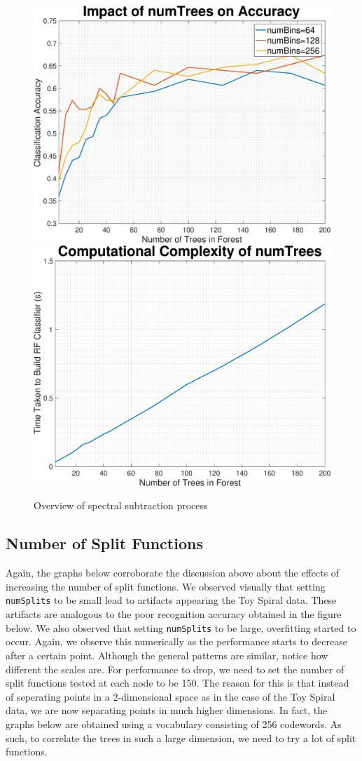 \documentclass[a4paper,pra,twocolumn,10pt,aps,longbibliography,nobalancelastpage]{revtex4-1}
\begin{document}
\begin{figure}[H]
	\centering
    \includegraphics[width=0.49\columnwidth]{numTrees_acc}
	\includegraphics[width=0.49\columnwidth]{numTrees_complexity}
    \caption{Overview of spectral subtraction process}
    \label{fig:numtrees_caltech}
\end{figure}

\subsection*{Number of Split Functions}

Again, the graphs below corroborate the discussion above about the effects of increasing the number of split functions. We observed visually that setting \texttt{numSplits} to be small lead to artifacts appearing the Toy Spiral data. These artifacts are analogous to the poor recognition accuracy obtained in the figure below. We also observed that setting \texttt{numSplits} to be large, overfitting started to occur. Again, we observe this numerically as the performance starts to decrease after a certain point. Although the general patterns are similar, notice how different the scales are. For performance to drop, we need to set the number of split functions tested at each node to be 150. The reason for this is that instead of seperating points in a 2-dimensional space as in the case of the Toy Spiral data, we are now separating points in much higher dimensions. In fact, the graphs below are obtained using a vocabulary consisting of 256 codewords. As such, to correlate the trees in such a large dimension, we need to try a lot of split functions. 
\end{document}
